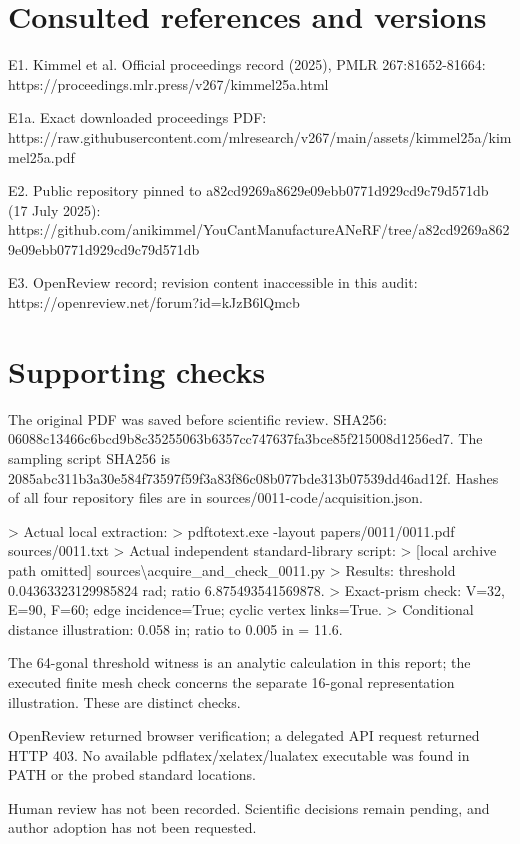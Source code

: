 \documentclass[10pt]{article}
\begin{document}
\section*{Consulted references and versions}
E1. Kimmel et al. Official proceedings record (2025), PMLR 267:81652-81664: https://proceedings.mlr.press/v267/kimmel25a.html\par
E1a. Exact downloaded proceedings PDF: https://raw.githubusercontent.com/mlresearch/v267/main/assets/kimmel25a/kimmel25a.pdf\par
E2. Public repository pinned to a82cd9269a8629e09ebb0771d929cd9c79d571db (17 July 2025): https://github.com/anikimmel/YouCantManufactureANeRF/tree/a82cd9269a8629e09ebb0771d929cd9c79d571db\par
E3. OpenReview record; revision content inaccessible in this audit: https://openreview.net/forum?id=kJzB6lQmcb\par
\section*{Supporting checks}
The original PDF was saved before scientific review. SHA256: 06088c13466c6bcd9b8c35255063b6357cc747637fa3bce85f215008d1256ed7. The sampling script SHA256 is 2085abc311b3a30e584f73597f59f3a83f86c08b077bde313b07539dd46ad12f. Hashes of all four repository files are in sources/0011-code/acquisition.json.\par
> Actual local extraction:
> pdftotext.exe -layout papers/0011/0011.pdf sources/0011.txt
> Actual independent standard-library script:
> [local archive path omitted] sources\textbackslash{}acquire\_and\_check\_0011.py
> Results: threshold 0.04363323129985824 rad; ratio 6.875493541569878. > Exact-prism check: V=32, E=90, F=60; edge incidence=True; cyclic vertex links=True. > Conditional distance illustration: 0.058 in; ratio to 0.005 in = 11.6.\par
The 64-gonal threshold witness is an analytic calculation in this report; the executed finite mesh check concerns the separate 16-gonal representation illustration. These are distinct checks.\par
OpenReview returned browser verification; a delegated API request returned HTTP 403. No available pdflatex/xelatex/lualatex executable was found in PATH or the probed standard locations.\par
Human review has not been recorded. Scientific decisions remain pending, and author adoption has not been requested.\par
\end{document}

